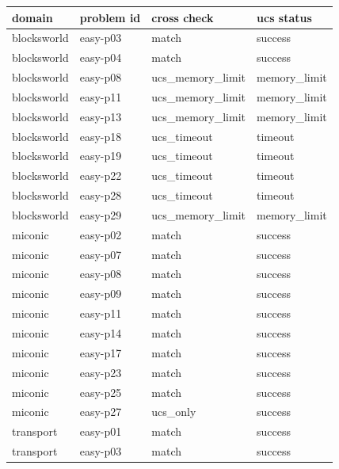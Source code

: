 \endgroup
\begingroup
\setlength{\tabcolsep}{2pt}
\begin{longtable}{>{\raggedright\arraybackslash}p{}>{\raggedright\arraybackslash}p{}>{\raggedright\arraybackslash}p{}>{\raggedright\arraybackslash}p{}}
\hline
domain & problem id & cross check & ucs status \\ \hline\endhead
blocksworld & easy-p03 & match & success \\
blocksworld & easy-p04 & match & success \\
blocksworld & easy-p08 & ucs\_\allowbreak{}memory\_\allowbreak{}limit & memory\_\allowbreak{}limit \\
blocksworld & easy-p11 & ucs\_\allowbreak{}memory\_\allowbreak{}limit & memory\_\allowbreak{}limit \\
blocksworld & easy-p13 & ucs\_\allowbreak{}memory\_\allowbreak{}limit & memory\_\allowbreak{}limit \\
blocksworld & easy-p18 & ucs\_\allowbreak{}timeout & timeout \\
blocksworld & easy-p19 & ucs\_\allowbreak{}timeout & timeout \\
blocksworld & easy-p22 & ucs\_\allowbreak{}timeout & timeout \\
blocksworld & easy-p28 & ucs\_\allowbreak{}timeout & timeout \\
blocksworld & easy-p29 & ucs\_\allowbreak{}memory\_\allowbreak{}limit & memory\_\allowbreak{}limit \\
miconic & easy-p02 & match & success \\
miconic & easy-p07 & match & success \\
miconic & easy-p08 & match & success \\
miconic & easy-p09 & match & success \\
miconic & easy-p11 & match & success \\
miconic & easy-p14 & match & success \\
miconic & easy-p17 & match & success \\
miconic & easy-p23 & match & success \\
miconic & easy-p25 & match & success \\
miconic & easy-p27 & ucs\_\allowbreak{}only & success \\
transport & easy-p01 & match & success \\
transport & easy-p03 & match & success \\

\end{longtable}
